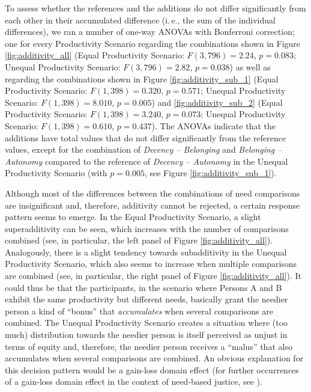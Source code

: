 \documentclass[egregdoesnotlikesansseriftitles]{scrartcl}
\begin{document}
To assess whether the references and the additions do not differ significantly from each other in their accumulated difference (i.\,e., the sum of the individual differences), we ran a number of one-way ANOVAs with Bonferroni correction; one for every Productivity Scenario regarding the combinations shown in Figure \ref{fig:additivity_all} (Equal Productivity Scenario: $F(3, 796) = 2.24$, $p = 0.083$; Unequal Productivity Scenario: $F(3, 796) = 2.82$, $p = 0.038$) as well as regarding the combinations shown in Figure \ref{fig:additivity_sub_1} (Equal Productivity Scenario: $F(1, 398) = 0.320$, $p = 0.571$; Unequal Productivity Scenario: $F(1, 398) = 8.010$, $p = 0.005$) and \ref{fig:additivity_sub_2} (Equal Productivity Scenario: $F(1, 398) = 3.240 $, $p = 0.073$; Unequal Productivity Scenario: $F(1, 398) = 0.610$, $p = 0.437$).
The ANOVAs indicate that the additions have total values that do not differ significantly from the reference values, except for the combination of \textit{Decency -- Belonging} and \textit{Belonging -- Autonomy} compared to the reference of \textit{Decency -- Autonomy} in the Unequal Productivity Scenario (with $p = 0.005$, see Figure \ref{fig:additivity_sub_1}).

Although most of the differences between the combinations of need comparisons are insignificant and, therefore, additivity cannot be rejected, a certain response pattern seems to emerge.
In the Equal Productivity Scenario, a slight superadditivity can be seen, which increases with the number of comparisons combined (see, in particular, the left panel of Figure \ref{fig:additivity_all}).
Analogously, there is a slight tendency towards subadditivity in the Unequal Productivity Scenario, which also seems to increase when multiple comparisons are combined (see, in particular, the right panel of Figure \ref{fig:additivity_all}).
It could thus be that the participants, in the scenario where Persons A and B exhibit the same productivity but different needs, basically grant the needier person a kind of ``bonus'' that \textit{accumulates} when several comparisons are combined.
The Unequal Productivity Scenario creates a situation where (too much) distribution towards the needier person is itself perceived as unjust in terms of equity and, therefore, the needier person receives a ``malus'' that also accumulates when several comparisons are combined.
An obvious explanation for this decision pattern would be a gain-loss domain effect (for further occurrences of a gain-loss domain effect in the context of need-based justice, see \citealt{weis_needs_2017}).
\end{document}
